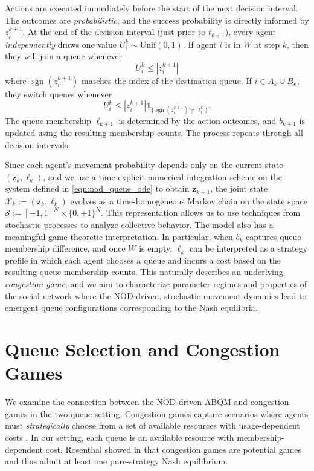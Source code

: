 \documentclass[conference]{IEEEtran}
\DeclareMathOperator{\sgn}{sgn}
\begin{document}
Actions are executed immediately before the start of the next decision interval. 
The outcomes are \emph{probabilistic}, and the success probability is directly informed by $z^{k+1}_i$. 
At the end of the decision interval (just prior to $t_{k+1}$), every agent \emph{independently} draws one value $U^k_i \sim \text{Unif}(0,1)$. If agent $i$ is in $W$ at step $k$, then they will join a queue whenever 
\begin{equation}
    U^k_i \leq |z^{k+1}_i|
\end{equation}
where  $\sgn(z^{k+1}_i)$ matches the index of the destination queue.
If $i \in A_k \cup B_k$, they switch queues whenever 
\begin{equation}
    U^k_i \leq |z^{k+1}_i|\mathds{1}_{\{\sgn(z^{k+1}_i) \neq \ell^k_i\}}.
\end{equation}
The queue membership $\boldsymbol{\ell}_{k+1}$ is determined by the action outcomes, and $b_{k+1}$ is updated using the resulting membership counts.
The process repeats through all decision intervals. 

Since each agent's movement probability depends only on the current state $(\boldsymbol{z}_k, \boldsymbol{\ell}_k)$, and we use a time-explicit numerical integration scheme on the system defined in \eqref{eqn:nod_queue_ode} to obtain $\boldsymbol{z}_{k+1}$, the joint state $\mathcal{X}_k := (\boldsymbol{z}_k, \boldsymbol{\ell}_k)$ evolves as a time-homogeneous Markov chain on the state space $\mathcal{S} := [-1, 1]^N \times \{0, \pm 1\}^N$. 
This representation allows us to use techniques from stochastic processes to analyze collective behavior. 
The model also has a meaningful game theoretic interpretation. 
In particular, when $b_k$ captures queue membership difference, and once $W$ is empty, $\boldsymbol{\ell}_k$ can be interpreted as a strategy profile in which each agent chooses a queue and incurs a cost based on the resulting queue membership counts. 
This naturally describes an underlying \emph{congestion game}, and we aim to characterize parameter regimes and properties of the social network where the NOD-driven, stochastic movement dynamics lead to emergent queue configurations corresponding to the Nash equilibria. 

\section{Queue Selection and Congestion Games}\label{sec:choice_and_games}
We examine the connection between the NOD-driven ABQM and congestion games in the two-queue setting. Congestion games capture scenarios where agents must \emph{strategically} choose from a set of available resources with usage-dependent costs \cite{roughgarden2005selfish}. In our setting, each queue is an available resource with membership-dependent cost.
Rosenthal showed in \cite{rosenthal1973class} that congestion games are potential games \cite{monderer1996potential} and thus admit at least one pure-strategy Nash equilibrium.
\end{document}
